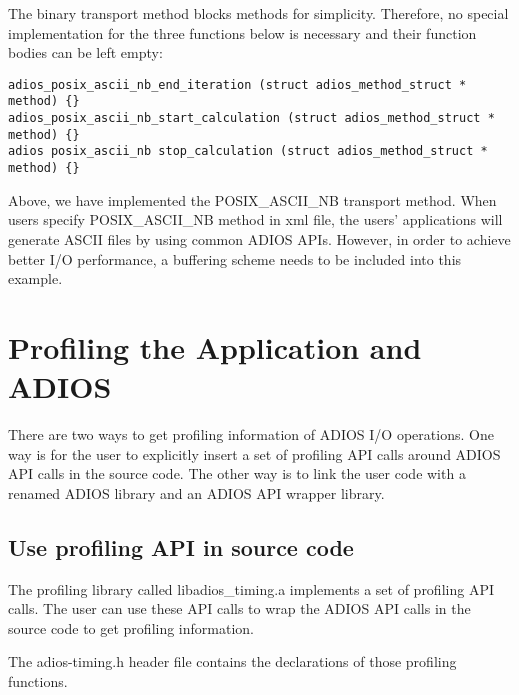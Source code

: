 The binary transport method blocks methods for simplicity. Therefore,  no special 
implementation for the three functions below is necessary and their function bodies 
can be left empty:

\begin{lstlisting}
adios_posix_ascii_nb_end_iteration (struct adios_method_struct * method) {}
adios_posix_ascii_nb_start_calculation (struct adios_method_struct * method) {}
adios posix_ascii_nb stop_calculation (struct adios_method_struct * method) {}
\end{lstlisting}

Above, we have implemented the POSIX\_ASCII\_NB transport method. When users specify 
POSIX\_ASCII\_NB method in xml file, the users' applications will generate ASCII 
files by using common ADIOS APIs. However, in order to achieve better I/O performance, 
a buffering scheme needs to be included into this example.

\section{Profiling the Application and ADIOS}

There are two ways to get profiling information of ADIOS I/O operations. One way 
is for the user to explicitly insert a set of profiling API calls around ADIOS 
API calls in the source code. The other way is to link the user code with a renamed 
ADIOS library and an ADIOS API wrapper library. 

\subsection{Use profiling API in source code}

The profiling library called libadios\_timing.a implements a set of profiling API 
calls. The user can use these API calls to wrap the ADIOS API calls in the source 
code to get profiling information. 

The adios-timing.h header file contains the declarations of those profiling functions. 

